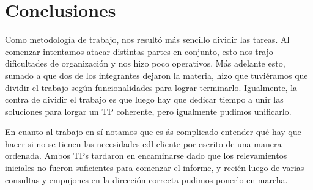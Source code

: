 \section{Conclusiones}
Como metodología de trabajo, nos resultó más sencillo dividir las tareas. Al comenzar intentamos atacar distintas partes en conjunto, esto nos trajo dificultades de organización y nos hizo poco operativos.
Más adelante esto, sumado a que dos de los integrantes dejaron la materia, hizo que tuviéramos que dividir el trabajo según funcionalidades para lograr terminarlo. Igualmente, la contra de dividir el trabajo es que luego hay que dedicar tiempo a unir las soluciones para lorgar un TP coherente, pero igualmente pudimos unificarlo.

En cuanto al trabajo en sí notamos que es ás complicado entender qué hay que hacer si no se tienen las necesidades edl cliente por escrito de una manera ordenada. Ambos TPs tardaron en encaminarse dado que  los relevamientos iniciales no fueron suficientes para comenzar el informe, y recién luego de varias consultas y empujones en la dirección correcta pudimos ponerlo en marcha.

